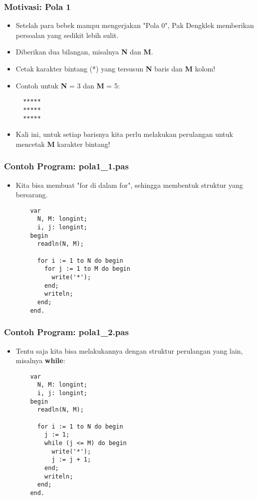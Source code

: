 \begin{frame}[fragile]
\frametitle{Motivasi: Pola 1}
\begin{itemize}
  \item Setelah para bebek mampu mengerjakan "Pola 0", Pak Dengklek memberikan persoalan yang sedikit lebih sulit.
  \item Diberikan dua bilangan, misalnya \textbf{N} dan \textbf{M}.
  \item Cetak karakter bintang (*) yang tersusun \textbf{N} baris dan \textbf{M} kolom!

  \item Contoh untuk \textbf{N} = 3 dan \textbf{M} = 5:
  \begin{lstlisting}
  *****
  *****
  *****
  \end{lstlisting}

  \item Kali ini, untuk setiap barisnya kita perlu melakukan perulangan untuk mencetak \textbf{M} karakter bintang!
\end{itemize}
\end{frame}

\begin{frame}[fragile]
\frametitle{Contoh Program: pola1\_1.pas}
\begin{itemize}
  \item Kita bisa membuat "for di dalam for", sehingga membentuk struktur yang bersarang.
  \begin{lstlisting}
    var
      N, M: longint;
      i, j: longint;
    begin
      readln(N, M);

      for i := 1 to N do begin
        for j := 1 to M do begin
          write('*');
        end;
        writeln;
      end;
    end.
  \end{lstlisting}
\end{itemize}
\end{frame}

\begin{frame}[fragile]
\frametitle{Contoh Program: pola1\_2.pas}
\begin{itemize}
  \item Tentu saja kita bisa melakukannya dengan struktur perulangan yang lain, misalnya \textbf{while}:
  \begin{lstlisting}
    var
      N, M: longint;
      i, j: longint;
    begin
      readln(N, M);

      for i := 1 to N do begin
        j := 1;
        while (j <= M) do begin
          write('*');
          j := j + 1;
        end;
        writeln;
      end;
    end.
  \end{lstlisting}
\end{itemize}
\end{frame}

